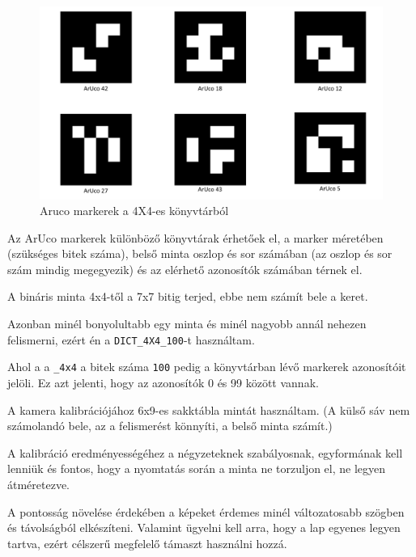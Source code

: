 \begin{figure}[htp]
    \centering
   	\includegraphics[width=4.8truecm, height=3truecm]{images/kep.png}
	\caption{Aruco markerek a 4X4-es könyvtárból}
\end{figure}


Az ArUco markerek különböző könyvtárak érhetőek el, a marker méretében (szükséges bitek száma), belső minta oszlop és sor számában (az oszlop és sor szám mindig megegyezik) és az elérhető azonosítók számában térnek el.


A bináris minta 4x4-től a 7x7 bitig terjed, ebbe nem számít bele a keret.

Azonban minél bonyolultabb egy minta és minél nagyobb annál nehezen felismerni, ezért én a  \texttt{DICT\_4X4\_100}-t használtam.

Ahol a a \texttt{\_4x4} a bitek száma \texttt{100} pedig a könyvtárban lévő markerek azonosítóit jelöli.
Ez azt jelenti, hogy az azonosítók  0 és 99 között vannak.



A kamera kalibrációjához 6x9-es sakktábla mintát használtam. (A külső sáv nem számolandó bele, az a felismerést könnyíti, a belső minta számít.)

A kalibráció eredményességéhez a négyzeteknek szabályosnak, egyformának kell lenniük és fontos, hogy a nyomtatás során a minta ne torzuljon el, ne legyen átméretezve.

A pontosság növelése érdekében a képeket érdemes minél változatosabb szögben és távolságból elkészíteni. Valamint ügyelni kell arra, hogy a lap egyenes legyen tartva, ezért célszerű megfelelő támaszt használni hozzá.

